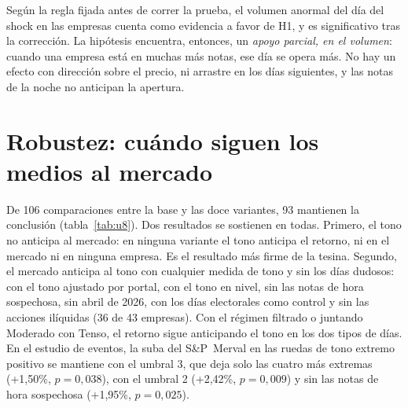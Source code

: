 Según la regla fijada antes de correr la prueba, el volumen anormal del día del shock en las
empresas cuenta como evidencia a favor de H1, y es significativo tras la corrección. La
hipótesis encuentra, entonces, un \textit{apoyo parcial, en el volumen}: cuando una empresa
está en muchas más notas, ese día se opera más. No hay un efecto con dirección sobre el precio,
ni arrastre en los días siguientes, y las notas de la noche no anticipan la apertura.

\section{Robustez: cuándo siguen los medios al mercado}
\label{sec:res-u8}

De 106 comparaciones entre la base y las doce variantes, 93 mantienen la conclusión
(tabla~\ref{tab:u8}). Dos resultados se sostienen en todas. Primero, el tono no anticipa al
mercado: en ninguna variante el tono anticipa el retorno, ni en el mercado ni en ninguna
empresa. Es el resultado más firme de la tesina. Segundo, el mercado anticipa al tono con
cualquier medida de tono y sin los días dudosos: con el tono ajustado por portal, con el tono
en nivel, sin las notas de hora sospechosa, sin abril de 2026, con los días electorales como
control y sin las acciones ilíquidas (36 de 43 empresas). Con el régimen filtrado o juntando
Moderado con Tenso, el retorno sigue anticipando el tono en los dos tipos de días. En el estudio
de eventos, la suba del S\&P~Merval en las ruedas de tono extremo positivo se mantiene con el
umbral 3, que deja solo las cuatro más extremas (+1,50\%, $p=0{,}038$), con el umbral 2
(+2,42\%, $p=0{,}009$) y sin las notas de hora sospechosa (+1,95\%, $p=0{,}025$).

